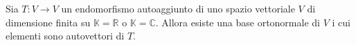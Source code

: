 \begin{theorem}
	Sia $T : V  \to V$ un endomorfismo autoaggiunto di uno spazio vettoriale $V$ di
	dimensione finita su $\mathbb{K} = \mathbb{R}$ o $\mathbb{K} = \mathbb{C}$.
	Allora esiste una base ortonormale di $V$ i cui elementi sono autovettori di $T$.
\end{theorem}